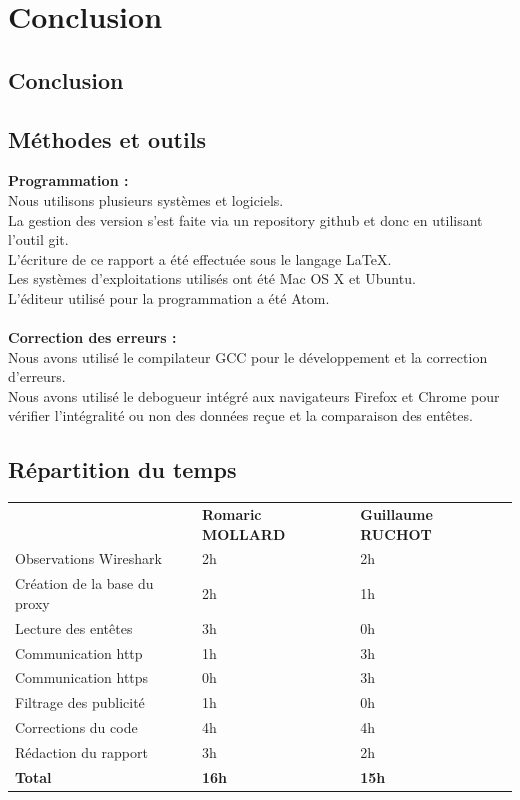 \documentclass{scrreprt}
\begin{document}
\chapter{Conclusion}

\section{Conclusion}


\section{Méthodes et outils}
\textbf{Programmation :}\\
Nous utilisons plusieurs systèmes et logiciels.\\
La gestion des version s'est faite via un repository github et donc en utilisant l'outil git.\\
L'écriture de ce rapport a été effectuée sous le langage LaTeX.\\
Les systèmes d'exploitations utilisés ont été Mac OS X et Ubuntu.\\
L'éditeur utilisé pour la programmation a été Atom.\\\\
\textbf{Correction des erreurs :}\\
Nous avons utilisé le compilateur GCC pour le développement et la correction d'erreurs.\\
Nous avons utilisé le debogueur intégré aux navigateurs Firefox et Chrome pour vérifier l'intégralité ou non des données reçue et la comparaison des entêtes.

\section{Répartition du temps}

\begin{tabular}{lll}
                                          & \textbf{Romaric MOLLARD} & \textbf{Guillaume RUCHOT} \\
Observations Wireshark                    & 2h              & 2h            \\
Création de la base du proxy              & 2h              & 1h            \\
Lecture des entêtes                       & 3h              & 0h            \\
Communication http                        & 1h              & 3h            \\
Communication https                       & 0h              & 3h            \\
Filtrage des publicité                    & 1h              & 0h            \\
Corrections du code                       & 4h              & 4h           \\
Rédaction du rapport                      & 3h              & 2h           \\
\textbf{Total}                            & \textbf{16h}             & \textbf{15h}
\end{tabular}
\end{document}
